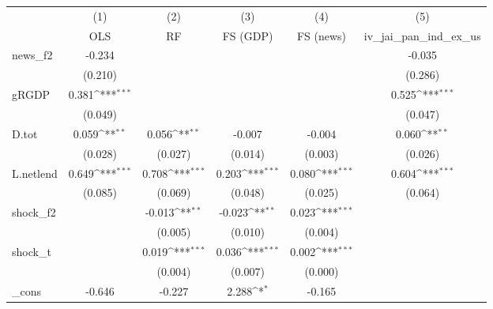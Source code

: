 {
\def\sym#1{\ifmmode^{#1}\else\(^{#1}\)\fi}
\begin{tabular}{l*{5}{c}}
\toprule
            &\multicolumn{1}{c}{(1)}&\multicolumn{1}{c}{(2)}&\multicolumn{1}{c}{(3)}&\multicolumn{1}{c}{(4)}&\multicolumn{1}{c}{(5)}\\
            &\multicolumn{1}{c}{OLS}&\multicolumn{1}{c}{RF}&\multicolumn{1}{c}{FS (GDP)}&\multicolumn{1}{c}{FS (news)}&\multicolumn{1}{c}{iv\_jai\_pan\_ind\_ex\_us}\\
\midrule
news\_f2     &      -0.234         &                     &                     &                     &      -0.035         \\
            &     (0.210)         &                     &                     &                     &     (0.286)         \\
\addlinespace
gRGDP       &       0.381\sym{***}&                     &                     &                     &       0.525\sym{***}\\
            &     (0.049)         &                     &                     &                     &     (0.047)         \\
\addlinespace
D.tot       &       0.059\sym{**} &       0.056\sym{**} &      -0.007         &      -0.004         &       0.060\sym{**} \\
            &     (0.028)         &     (0.027)         &     (0.014)         &     (0.003)         &     (0.026)         \\
\addlinespace
L.netlend   &       0.649\sym{***}&       0.708\sym{***}&       0.203\sym{***}&       0.080\sym{***}&       0.604\sym{***}\\
            &     (0.085)         &     (0.069)         &     (0.048)         &     (0.025)         &     (0.064)         \\
\addlinespace
shock\_f2    &                     &      -0.013\sym{**} &      -0.023\sym{**} &       0.023\sym{***}&                     \\
            &                     &     (0.005)         &     (0.010)         &     (0.004)         &                     \\
\addlinespace
shock\_t     &                     &       0.019\sym{***}&       0.036\sym{***}&       0.002\sym{***}&                     \\
            &                     &     (0.004)         &     (0.007)         &     (0.000)         &                     \\
\addlinespace
\_cons      &      -0.646         &      -0.227         &       2.288\sym{*}  &      -0.165         &                     \\

\end{tabular}}
